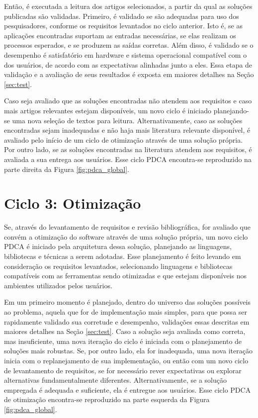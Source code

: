 \documentclass[cic,tc]{iiufrgs}
\begin{document}
Então, é executada a leitura dos artigos selecionados, a partir da qual as
soluções publicadas são validadas. Primeiro, é validado se são adequadas para
uso dos pesquisadores, conforme os requisitos levantados no ciclo anterior.
Isto é, se as aplicações encontradas suportam as entradas necessárias, se elas
realizam os processos esperados, e se produzem as saídas corretas. Além disso,
é validado se o desempenho é satisfatório em hardware e sistema operacional
compatível com o dos usuários, de acordo com as expectativas alinhadas junto a
eles. Essa etapa de validação e a avaliação de seus resultados é exposta em
maiores detalhes na Seção \ref{sec:test}. 

Caso seja avaliado que as soluções encontradas não atendem aos requisitos e
caso mais artigos relevantes estejam disponíveis, um novo ciclo é iniciado
planejando-se uma nova seleção de textos para leitura. Alternativamente, caso
as soluções encontradas sejam inadequadas e não haja mais literatura relevante
disponível, é avaliado pelo início de um ciclo de otimização através de uma
solução própria. Por outro lado, se as soluções encontradas na literatura
atendem aos requisitos, é avaliada a sua entrega aos usuários. Esse ciclo PDCA
encontra-se reproduzido na parte direita da Figura \ref{fig:pdca_global}.

\section{Ciclo 3: Otimização}
\label{sec:dev}

Se, através do levantamento de requisitos e revisão bibliográfica, for avaliado
que convém a otimização do software através de uma solução própria, um novo
ciclo PDCA é iniciado pela arquitetura dessa solução, planejando as linguagens,
bibliotecas e técnicas a serem adotadas. Esse planejamento é feito levando em
consideração os requisitos levantados, selecionando linguagens e bibliotecas
compatíveis com as ferramentas sendo otimizadas e que estejam disponíveis nos
ambientes utilizados pelos usuários. 

Em um primeiro momento é planejado, dentro do universo das soluções possíveis
ao problema, aquela que for de implementação mais simples, para que possa ser
rapidamente validado sua corretude e desempenho, validações essas descritas em
maiores detalhes na Seção \ref{sec:test}. Caso a solução seja avaliada como correta,
mas insuficiente, uma nova iteração do ciclo é iniciada com o planejamento de
soluções mais robustas. Se, por outro lado, ela for inadequada, uma nova
iteração inicia com o replanejamento de sua implementação, ou então com um novo
ciclo de levantamento de requisitos, se for necessário rever expectativas ou
explorar alternativas fundamentalmente diferentes.  Alternativamente, se a
solução empregada é adequada e suficiente, ela é entregue aos usuários. Esse
ciclo PDCA de otimização encontra-se reproduzido na parte esquerda da Figura
\ref{fig:pdca_global}. 
\end{document}
